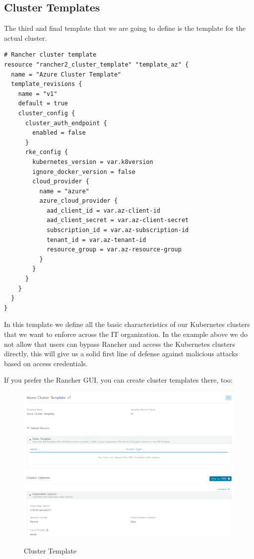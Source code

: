 \subsection{Cluster Templates}

The third and final template that we are going to define is the template for the actual cluster.

\begin{lstlisting}[caption=Cluster Template, frame=single, basicstyle=\ttfamily]
# Rancher cluster template 
resource "rancher2_cluster_template" "template_az" {
  name = "Azure Cluster Template"
  template_revisions {
    name = "v1"
    default = true
    cluster_config {
      cluster_auth_endpoint {
        enabled = false
      }
      rke_config {
        kubernetes_version = var.k8version
        ignore_docker_version = false
        cloud_provider {
          name = "azure"
          azure_cloud_provider {
            aad_client_id = var.az-client-id
            aad_client_secret = var.az-client-secret
            subscription_id = var.az-subscription-id
            tenant_id = var.az-tenant-id
            resource_group = var.az-resource-group
          }
        }
      }
    }
  }
}
\end{lstlisting}

In this template we define all the basic characteristics of our Kubernetes clusters that we want to enforce across the IT organization. In the example above we do not allow that users can bypass Rancher and access the Kubernetes clusters directly, this will give us a solid first line of defense against malicious attacks based on access credentials.

If you prefer the Rancher GUI, you can create cluster templates there, too:

\begin{figure}[H]
\centering
\caption {Cluster Template}
\includegraphics[width=\linewidth]{images/cluster-template.png}
\label{fig:clusterTemplate}
\end{figure}

